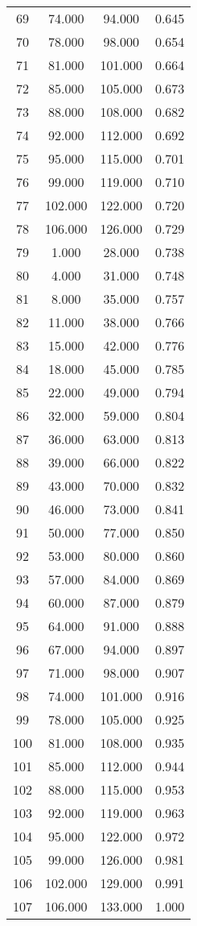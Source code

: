\begin{tabular}{cccc}
  69 & 74.000 & 94.000 & 0.645 \\ 
  70 & 78.000 & 98.000 & 0.654 \\ 
  71 & 81.000 & 101.000 & 0.664 \\ 
  72 & 85.000 & 105.000 & 0.673 \\ 
  73 & 88.000 & 108.000 & 0.682 \\ 
  74 & 92.000 & 112.000 & 0.692 \\ 
  75 & 95.000 & 115.000 & 0.701 \\ 
  76 & 99.000 & 119.000 & 0.710 \\ 
  77 & 102.000 & 122.000 & 0.720 \\ 
  78 & 106.000 & 126.000 & 0.729 \\ 
  79 & 1.000 & 28.000 & 0.738 \\ 
  80 & 4.000 & 31.000 & 0.748 \\ 
  81 & 8.000 & 35.000 & 0.757 \\ 
  82 & 11.000 & 38.000 & 0.766 \\ 
  83 & 15.000 & 42.000 & 0.776 \\ 
  84 & 18.000 & 45.000 & 0.785 \\ 
  85 & 22.000 & 49.000 & 0.794 \\ 
  86 & 32.000 & 59.000 & 0.804 \\ 
  87 & 36.000 & 63.000 & 0.813 \\ 
  88 & 39.000 & 66.000 & 0.822 \\ 
  89 & 43.000 & 70.000 & 0.832 \\ 
  90 & 46.000 & 73.000 & 0.841 \\ 
  91 & 50.000 & 77.000 & 0.850 \\ 
  92 & 53.000 & 80.000 & 0.860 \\ 
  93 & 57.000 & 84.000 & 0.869 \\ 
  94 & 60.000 & 87.000 & 0.879 \\ 
  95 & 64.000 & 91.000 & 0.888 \\ 
  96 & 67.000 & 94.000 & 0.897 \\ 
  97 & 71.000 & 98.000 & 0.907 \\ 
  98 & 74.000 & 101.000 & 0.916 \\ 
  99 & 78.000 & 105.000 & 0.925 \\ 
  100 & 81.000 & 108.000 & 0.935 \\ 
  101 & 85.000 & 112.000 & 0.944 \\ 
  102 & 88.000 & 115.000 & 0.953 \\ 
  103 & 92.000 & 119.000 & 0.963 \\ 
  104 & 95.000 & 122.000 & 0.972 \\ 
  105 & 99.000 & 126.000 & 0.981 \\ 
  106 & 102.000 & 129.000 & 0.991 \\ 
  107 & 106.000 & 133.000 & 1.000 \\ 
   \hline
\end{tabular}
